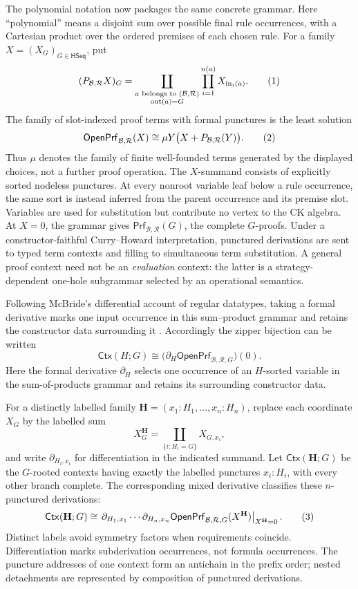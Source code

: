 \documentclass[10pt,a4paper]{article}
\theoremstyle{plain}
\theoremstyle{definition}
\theoremstyle{remark}
\newcommand{\Base}{\mathcal B}
\newcommand{\Rules}{\mathcal R}
\newcommand{\HSeq}{\mathsf{HSeq}}
\newcommand{\Ctx}{\mathsf{Ctx}}
\newcommand{\Prf}{\mathsf{Prf}}
\newcommand{\OpenPrf}{\mathsf{OpenPrf}}
\newcommand{\eqtag}{\refstepcounter{equation}\tag{\theequation}}
\begin{document}
The polynomial notation now packages the same concrete grammar.  Here
``polynomial'' means a disjoint sum over possible final rule occurrences,
with a Cartesian product over the ordered premises of each chosen rule.
For a family \(X=(X_G)_{G\in\HSeq}\), put
\[
 (P_{\Base,\Rules}X)_G=
 \coprod_{\substack{a\text{ belongs to }(\Base,\Rules)\\
                    \operatorname{out}(a)=G}}
       \prod_{i=1}^{n(a)}X_{\operatorname{in}_i(a)}.
\eqtag\label{eq:proof-polynomial}
\]
The family of slot-indexed proof terms with formal punctures is the least
solution
\[
 \OpenPrf_{\Base,\Rules}(X)\cong
       \mu Y\bigl(X+P_{\Base,\Rules}(Y)\bigr).
\eqtag\label{eq:free-proof-grammar}
\]
Thus \(\mu\) denotes the family of finite well-founded terms generated by
the displayed choices, not a further proof operation.  The \(X\)-summand
consists of explicitly sorted nodeless punctures.  At every nonroot
variable leaf below a rule occurrence, the same sort is instead inferred
from the parent occurrence and its premise slot.  Variables are used for
substitution but contribute no vertex to the CK algebra.  At \(X=0\), the
grammar gives \(\Prf_{\Base,\Rules}(G)\), the complete \(G\)-proofs.
Under a constructor-faithful Curry--Howard interpretation, punctured
derivations are sent to typed term contexts and filling to simultaneous
term substitution.  A general proof context need not be an
\emph{evaluation} context: the latter is a strategy-dependent one-hole
subgrammar selected by an operational semantics.

Following McBride's differential account of regular datatypes, taking a
formal derivative marks one input occurrence in this sum--product grammar
and retains the constructor data surrounding it
\cite{mcbride2001,abbott2003derivatives}.  Accordingly the zipper
bijection can be written
\[
 \Ctx(H;G)\cong
 \bigl(\partial_H\OpenPrf_{\Base,\Rules,G}\bigr)(0).
\]
Here the formal derivative \(\partial_H\) selects one occurrence of an
\(H\)-sorted variable in the sum-of-products grammar and retains its
surrounding constructor data.

For a distinctly labelled family
\(\mathbf H=(x_1:H_1,\ldots,x_n:H_n)\), replace each coordinate \(X_G\)
by the labelled sum
\[
 X^{\mathbf H}_G
   =\coprod_{\{i:H_i=G\}}X_{G,x_i},
\]
and write \(\partial_{H_i,x_i}\) for differentiation in the indicated
summand.  Let \(\Ctx(\mathbf H;G)\) be the \(G\)-rooted contexts having
exactly the labelled punctures \(x_i:H_i\), with every other branch
complete.  The corresponding mixed derivative classifies these
\(n\)-punctured derivations:
\[
 \Ctx(\mathbf H;G)
 \cong
 \left.
 \partial_{H_1,x_1}\cdots\partial_{H_n,x_n}
 \OpenPrf_{\Base,\Rules,G}(X^{\mathbf H})
 \right|_{X^{\mathbf H}=0}.
\eqtag\label{eq:typed-multizipper}
\]
Distinct labels avoid symmetry factors when requirements coincide.
Differentiation marks subderivation occurrences, not formula occurrences.
The puncture addresses of one context form an antichain in the prefix
order; nested detachments are
represented by composition of punctured derivations.
\end{document}
